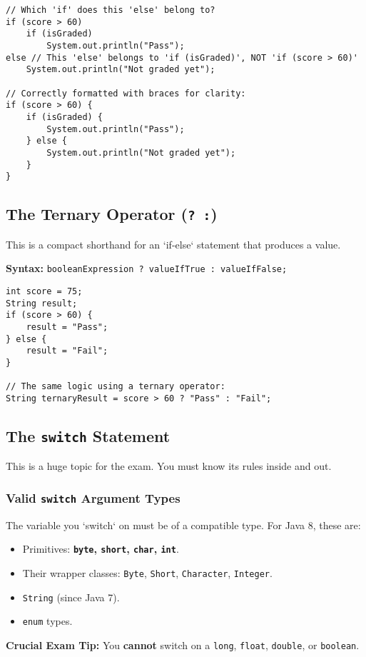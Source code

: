 \documentclass[12pt]{article}
\begin{document}
\begin{enumerate}[label=(\arabic*)]
\begin{verbatim}
// Which 'if' does this 'else' belong to?
if (score > 60)
    if (isGraded)
        System.out.println("Pass");
else // This 'else' belongs to 'if (isGraded)', NOT 'if (score > 60)'
    System.out.println("Not graded yet");

// Correctly formatted with braces for clarity:
if (score > 60) {
    if (isGraded) {
        System.out.println("Pass");
    } else {
        System.out.println("Not graded yet");
    }
}
\end{verbatim}

\subsection*{The Ternary Operator (\texttt{? :})}
This is a compact shorthand for an `if-else` statement that produces a value.

\textbf{Syntax:} \texttt{booleanExpression ? valueIfTrue : valueIfFalse;}
\begin{verbatim}
int score = 75;
String result;
if (score > 60) {
    result = "Pass";
} else {
    result = "Fail";
}

// The same logic using a ternary operator:
String ternaryResult = score > 60 ? "Pass" : "Fail";
\end{verbatim}

\subsection*{The \texttt{switch} Statement}
This is a huge topic for the exam. You must know its rules inside and out.

\subsubsection*{Valid \texttt{switch} Argument Types}
The variable you `switch` on must be of a compatible type. For Java 8, these are:
\begin{itemize}
    \item Primitives: \textbf{\texttt{byte}, \texttt{short}, \texttt{char}, \texttt{int}}.
    \item Their wrapper classes: \texttt{Byte}, \texttt{Short}, \texttt{Character}, \texttt{Integer}.
    \item \texttt{String} (since Java 7).
    \item \texttt{enum} types.
\end{itemize}
\textbf{Crucial Exam Tip:} You \textbf{cannot} switch on a \texttt{long}, \texttt{float}, \texttt{double}, or \texttt{boolean}.


\end{enumerate}
\end{document}
